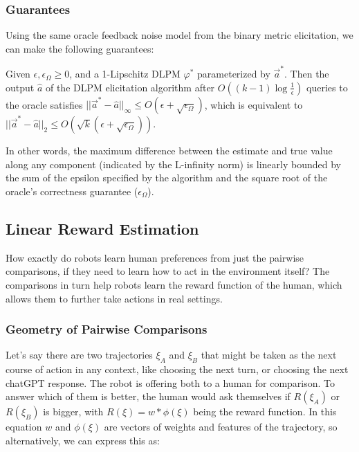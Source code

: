 \documentclass[
  letterpaper,
  numbers=noenddot,
  DIV=11]{scrreprt}
\theoremstyle{definition}
\theoremstyle{plain}
\theoremstyle{plain}
\theoremstyle{remark}
\begin{document}
\subsubsection*{Guarantees}\label{guarantees-1}

Using the same oracle feedback noise model from the binary metric
elicitation, we can make the following guarantees:

\begin{tcolorbox}[colframe=.grey, title=\faPenSquare \enspace Proposition]

\label{prop-prop_dlpm}
Given \(\epsilon, \epsilon_\Omega \geq 0\), and a 1-Lipschitz DLPM
\(\varphi^*\) parameterized by \(\vec{a}^*\). Then the output
\(\hat{a}\) of the DLPM elicitation algorithm after
\(O((k-1)\log\frac{1}{\epsilon})\) queries to the oracle satisfies
\(||\vec{a}^* - \hat{a}||_\infty \leq O(\epsilon + \sqrt{\epsilon_\Omega})\),
which is equivalent to
\(||\vec{a}^* - \hat{a}||_2 \leq O(\sqrt{k}(\epsilon + \sqrt{\epsilon_\Omega}))\).

\end{tcolorbox}

In other words, the maximum difference between the estimate and true
value along any component (indicated by the L-infinity norm) is linearly
bounded by the sum of the epsilon specified by the algorithm and the
square root of the oracle's correctness guarantee (\(\epsilon_\Omega\)).

\subsection{Linear Reward Estimation}\label{linear-reward-estimation}

How exactly do robots learn human preferences from just the pairwise
comparisons, if they need to learn how to act in the environment itself?
The comparisons in turn help robots learn the reward function of the
human, which allows them to further take actions in real settings.

\subsubsection*{Geometry of Pairwise
Comparisons}\label{geometry-of-pairwise-comparisons}

Let's say there are two trajectories \(\xi_A\) and \(\xi_B\) that might
be taken as the next course of action in any context, like choosing the
next turn, or choosing the next chatGPT response. The robot is offering
both to a human for comparison. To answer which of them is better, the
human would ask themselves if \(R(\xi_A)\) or \(R(\xi_B)\) is bigger,
with \(R(\xi) = w * \phi(\xi)\) being the reward function. In this
equation \(w\) and \(\phi(\xi)\) are vectors of weights and features of
the trajectory, so alternatively, we can express this as:
\end{document}
